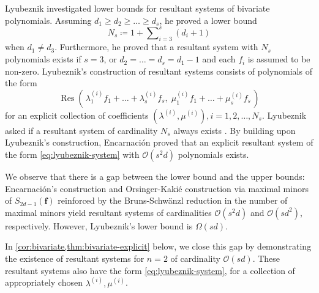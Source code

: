 \documentclass[11pt,a4paper]{article}
\numberwithin{equation}{section}
\newcommand{\cO}{\mathcal{O}}
\newcommand{\ff}{\ensuremath{\boldsymbol{f}}}
\DeclareMathOperator{\Res}{Res}
\begin{document}
Lyubeznik \cite{Lyubeznik-95} investigated lower bounds for resultant systems of bivariate polynomials.
Assuming $d_1\geq d_2\geq\dots\geq d_s$, he proved a lower bound \begin{equation}
\label{eq:lyubeznik-lower-bound}
N_s \coloneqq 1 + \sum\nolimits_{i=3}^s (d_i + 1)
\end{equation} when $d_1 \neq d_3$. 
Furthermore, he proved that a resultant system with $N_s$ polynomials exists if $s=3$, or $d_2=\dots=d_s=d_1-1$ and each $f_i$ is assumed to be non-zero.
Lyubeznik's construction of resultant systems consists of polynomials of the form \begin{equation}
\label{eq:lyubeznik-system}
\Res(\,\lambda^{(i)}_1 f_1+\dots+\lambda^{(i)}_s f_s,\; \mu^{(i)}_1 f_1 + \dots + \mu^{(i)}_s f_s\,)
\end{equation} for an explicit collection of coefficients $(\lambda^{(i)},\mu^{(i)}), i=1,2,\dots, N_s$.
Lyubeznik asked if a resultant system of cardinality $N_s$ always exists \cite[Questions 1 and 2]{Lyubeznik-95}.
By building upon Lyubeznik's construction, Encarnaci\'{o}n \cite{Encarnacion-98} proved that an explicit resultant system of the form \eqref{eq:lyubeznik-system} with $\cO(s^2d)$ polynomials exists.

We observe that there is a gap between the lower bound and the upper bounds: 
Encarnaci\'{o}n's \cite{Encarnacion-98} construction and Orsinger-Kaki\'{e} \cite{Orsinger-51,Kakie-76} construction via maximal minors of $S_{2d-1}(\ff)$ reinforced by the Bruns-Schw{\"a}nzl reduction in the number of maximal minors yield resultant systems of cardinalities $\cO(s^2d)$ and $\cO(sd^2)$, respectively.
However, Lyubeznik's \cite{Lyubeznik-95} lower bound is $\Omega(sd)$.

In \cref{cor:bivariate,thm:bivariate-explicit} below, we close this gap by demonstrating the existence of resultant systems for $n=2$ of cardinality $\cO(sd)$.
These resultant systems also have the form \eqref{eq:lyubeznik-system}, for a collection of appropriately chosen $\lambda^{(i)},\mu^{(i)}$.
\end{document}
